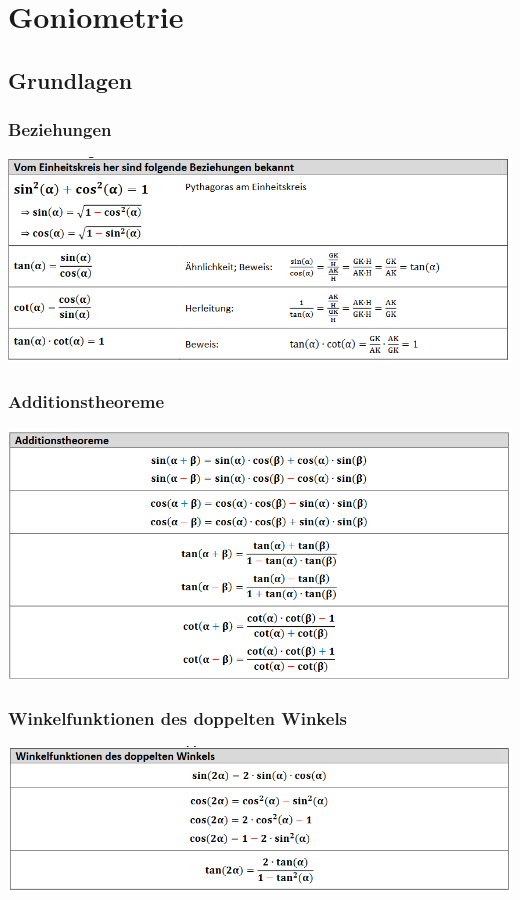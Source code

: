 \newpage{}
\section{Goniometrie}
\subsection{Grundlagen}
\subsubsection{Beziehungen}
\includegraphics[scale=0.7]{gon1.PNG}

\subsubsection{Additionstheoreme}
\includegraphics[scale=0.7]{gon2.PNG}

\subsubsection{Winkelfunktionen des doppelten Winkels}
\includegraphics[scale=0.7]{gon3.PNG}

